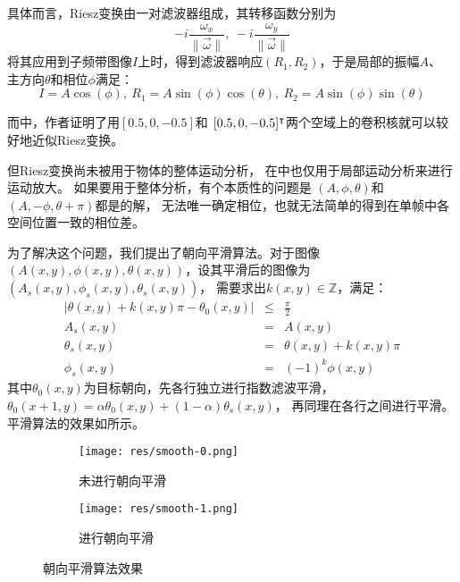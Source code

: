 具体而言，Riesz变换由一对滤波器组成，其转移函数分别为
\begin{equation}
    -i\frac{\omega_x}{\parallel \overrightarrow{ \omega} \parallel},~
    -i\frac{\omega_y}{\parallel \overrightarrow{ \omega} \parallel}
\end{equation}
将其应用到子频带图像$I$上时，得到滤波器响应$(R_1, R_2)$，于是局部的振幅$A$、
主方向$\theta$和相位$\phi$满足：
\begin{equation}
    I = A\cos(\phi),~R_1 = A\sin(\phi)\cos(\theta),~
    R_2 = A\sin(\phi)\sin(\theta)
    \label{eqn:riesz:decomp}
\end{equation}

而\cite{Wadhwa2014RieszPyramid}中，作者证明了用$[0.5,0,-0.5]$和
$[0.5,0,-0.5]^\intercal$两个空域上的卷积核就可以较好地近似Riesz变换。

但Riesz变换尚未被用于物体的整体运动分析，
在\cite{Wadhwa2014RieszPyramid}中也仅用于局部运动分析来进行运动放大。
如果要用于整体分析，有个本质性的问题是
$(A, \phi, \theta)$和$(A, -\phi, \theta + \pi)$都是的解，
无法唯一确定相位，也就无法简单的得到在单帧中各空间位置一致的相位差。

为了解决这个问题，我们提出了朝向平滑算法。对于图像$(A(x, y), \phi(x, y),
\theta(x, y))$，设其平滑后的图像为$(A_s(x, y), \phi_s(x, y), \theta_s(x, y))$，
需要求出$k(x, y)\in \mathbb{Z}$，满足：
\begin{eqnarray}
    |\theta(x, y) + k(x, y)\pi - \theta_0(x, y)| &\le& \frac{\pi}{2} \nonumber \\
    A_s(x, y) &=& A(x, y) \nonumber \\
    \theta_s(x, y) &=& \theta(x, y) + k(x, y)\pi \nonumber \\
    \phi_s(x, y) &=& (-1)^k\phi(x, y)
\end{eqnarray}
其中$\theta_0(x, y)$为目标朝向，先各行独立进行指数滤波平滑，
$\theta_0(x+1, y) = \alpha\theta_0(x, y) + (1-\alpha)\theta_s(x, y)$，
再同理在各行之间进行平滑。平滑算法的效果如所示。
\begin{figure}[h!]\begin{center}
    \begin{subfigure}[b]{.5\figwidth}
        \centering
        \texttt{[image: res/smooth-0.png]}
        \caption{未进行朝向平滑}
    \end{subfigure}
    \begin{subfigure}[b]{.5\figwidth}
        \centering
        \texttt{[image: res/smooth-1.png]}
        \caption{进行朝向平滑}
    \end{subfigure}
    \caption{朝向平滑算法效果\label{fig:smooth}}
\end{center}\end{figure}

